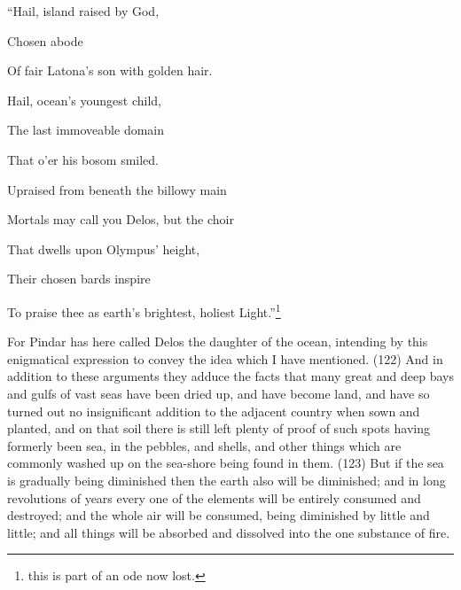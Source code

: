 ``Hail, island raised by God,

Chosen abode

Of fair Latona's son with golden hair.

Hail, ocean's youngest child,

The last immoveable domain

That o'er his bosom smiled.

Upraised from beneath the billowy main

Mortals may call you Delos, but the choir

That dwells upon Olympus' height,

Their chosen bards inspire

To praise thee as earth's brightest, holiest Light.''\footnote{this is part of an ode now lost.}

For Pindar has here called Delos the daughter of the ocean, intending by this enigmatical
expression to convey the idea which I have mentioned. (122) And in addition to these arguments
they adduce the facts that many great and deep bays and gulfs of vast seas have been dried up,
and have become land, and have so turned out no insignificant addition to the adjacent country
when sown and planted, and on that soil there is still left plenty of proof of such spots having
formerly been sea, in the pebbles, and shells, and other things which are commonly washed up on
the sea-shore being found in them. (123) But if the sea is gradually being diminished then the earth
also will be diminished; and in long revolutions of years every one of the elements will be entirely
consumed and destroyed; and the whole air will be consumed, being diminished by little and little;
and all things will be absorbed and dissolved into the one substance of fire.

